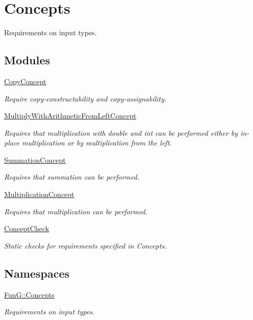 \hypertarget{group__Concepts}{}\section{Concepts}
\label{group__Concepts}


Requirements on input types.  


\subsection*{Modules}
\begin{DoxyCompactItemize}
\item 
\hyperlink{group__CopyConcept}{Copy\+Concept}
\begin{DoxyCompactList}\small\item\em Require copy-\/constructability and copy-\/assignability. \end{DoxyCompactList}\item 
\hyperlink{group__MultiplyWithArithmeticFromLeftConcept}{Multiply\+With\+Arithmetic\+From\+Left\+Concept}
\begin{DoxyCompactList}\small\item\em Requires that multiplication with double and int can be performed either by in-\/place multiplication or by multiplication from the left. \end{DoxyCompactList}\item 
\hyperlink{group__SummationConcept}{Summation\+Concept}
\begin{DoxyCompactList}\small\item\em Requires that summation can be performed. \end{DoxyCompactList}\item 
\hyperlink{group__MultiplicationConcept}{Multiplication\+Concept}
\begin{DoxyCompactList}\small\item\em Requires that multiplication can be performed. \end{DoxyCompactList}\item 
\hyperlink{group__ConceptCheck}{Concept\+Check}
\begin{DoxyCompactList}\small\item\em Static checks for requirements specified in Concepts. \end{DoxyCompactList}\end{DoxyCompactItemize}
\subsection*{Namespaces}
\begin{DoxyCompactItemize}
\item 
 \hyperlink{namespaceFunG_1_1Concepts}{Fun\+G\+::\+Concepts}
\begin{DoxyCompactList}\small\item\em Requirements on input types. \end{DoxyCompactList}\end{DoxyCompactItemize}
